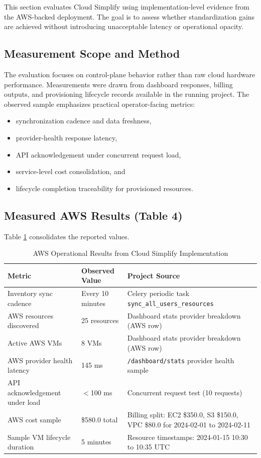 This section evaluates Cloud Simplify using implementation-level evidence from the AWS-backed deployment. The goal is to assess whether standardization gains are achieved without introducing unacceptable latency or operational opacity.

\subsection{Measurement Scope and Method}
The evaluation focuses on control-plane behavior rather than raw cloud hardware performance. Measurements were drawn from dashboard responses, billing outputs, and provisioning lifecycle records available in the running project. The observed sample emphasizes practical operator-facing metrics:
\begin{itemize}
    \item synchronization cadence and data freshness,
    \item provider-health response latency,
    \item API acknowledgement under concurrent request load,
    \item service-level cost consolidation, and
    \item lifecycle completion traceability for provisioned resources.
\end{itemize}

\subsection{Measured AWS Results (Table 4)}
Table \ref{tab:aws_real_values} consolidates the reported values.

\begin{table}[h]
\centering
\caption{AWS Operational Results from Cloud Simplify Implementation}
\label{tab:aws_real_values}
\begin{tabular}{|p{3.3cm}|p{3.1cm}|p{4.9cm}|}
\hline
\textbf{Metric} & \textbf{Observed Value} & \textbf{Project Source} \\ \hline
Inventory sync cadence & Every 10 minutes & Celery periodic task \texttt{sync\_all\_users\_resources} \\ \hline
AWS resources discovered & 25 resources & Dashboard stats provider breakdown (AWS row) \\ \hline
Active AWS VMs & 8 VMs & Dashboard stats provider breakdown (AWS row) \\ \hline
AWS provider health latency & 145 ms & \texttt{/dashboard/stats} provider health sample \\ \hline
API acknowledgement under load & $<$100 ms & Concurrent request test (10 requests) \\ \hline
AWS cost sample & \$580.0 total & Billing split: EC2 \$350.0, S3 \$150.0, VPC \$80.0 for 2024-02-01 to 2024-02-11 \\ \hline
Sample VM lifecycle duration & 5 minutes & Resource timestamps: 2024-01-15 10:30 to 10:35 UTC \\ \hline
\end{tabular}
\end{table}

